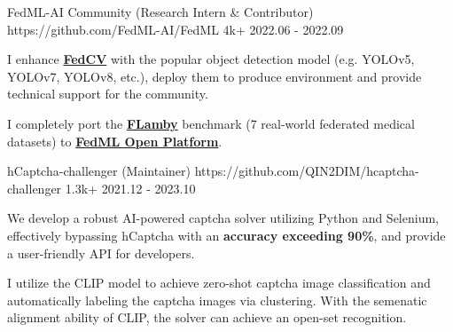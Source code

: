 
\begin{cventries}

\cvproject
{FedML-AI Community (Research Intern \& Contributor)} %
{https://github.com/FedML-AI/FedML} %
{4k+} %
{2022.06 - 2022.09} %
{
\begin{cvitems} %
\item {I enhance \href{https://github.com/FedML-AI/FedCV}{\textbf{FedCV}} with the popular object detection model (e.g. YOLOv5, YOLOv7, YOLOv8, etc.), deploy them to produce environment and provide technical support for the community.}
\item {I completely port the \href{https://github.com/owkin/FLamby}{\textbf{FLamby}} benchmark (7 real-world federated medical datasets) to \href{https://open.fedml.ai/}{\textbf{FedML Open Platform}}.}
\end{cvitems}
} %



\cvproject
{hCaptcha-challenger (Maintainer)} %
{https://github.com/QIN2DIM/hcaptcha-challenger} %
{1.3k+} %
{2021.12 - 2023.10} %
{
\begin{cvitems} %
\item {We develop a robust AI-powered captcha solver utilizing Python and Selenium, effectively bypassing hCaptcha with an \textbf{accuracy exceeding 90\%}, and provide a user-friendly API for developers.}
\item {I utilize the CLIP model to achieve zero-shot captcha image classification and automatically labeling the captcha images via clustering. With the semenatic alignment ability of CLIP, the solver can achieve an open-set recognition.}
\end{cvitems}
} %



\end{cventries}
